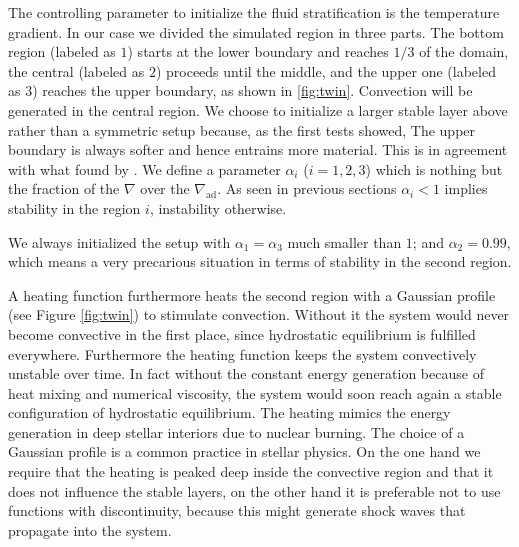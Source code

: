 The controlling parameter to initialize the fluid stratification is the temperature gradient. In our case we divided the simulated region in three parts. The bottom region (labeled as $1$) starts at the lower boundary and reaches $1/3$ of the domain, the central (labeled as $2$) proceeds until the middle, and the upper one (labeled as $3$) reaches the upper boundary, as shown in \ref{fig:twin}. Convection will be generated in the central region. We choose to initialize a larger stable layer above rather than a symmetric setup because, as the first tests showed, The upper boundary is always softer and hence entrains more material. This is in agreement with what found by \citet{meakin}. We define a parameter $\alpha_{i}$ ($i=1, 2, 3$) which is nothing but the fraction of the $\nabla$ over the $\nabla_{\mathrm{ad}}$. As seen in previous sections $\alpha_{i}<1$ implies stability in the region $i$, instability otherwise. 

We always initialized the setup with $\alpha_{1} = \alpha_{3}$ much smaller than $1$; and $\alpha_{2}=0.99$, which means a very precarious situation in terms of stability in the second region. 

A heating function furthermore heats the second region with a Gaussian profile (see Figure \ref{fig:twin}) to stimulate convection. Without it the system would never become convective in the first place, since hydrostatic equilibrium is fulfilled everywhere. Furthermore the heating function keeps the system convectively unstable over time. In fact without the constant energy generation because of heat mixing and numerical viscosity, the system would soon reach again a stable configuration of hydrostatic equilibrium. The heating mimics the energy generation in deep stellar interiors due to nuclear burning. The choice of a Gaussian profile is a common practice in stellar physics. On the one hand we require that the heating is peaked deep inside the convective region and that it does not influence the stable layers, on the other hand it is preferable not to use functions with discontinuity, because this might generate shock waves that propagate into the system.



